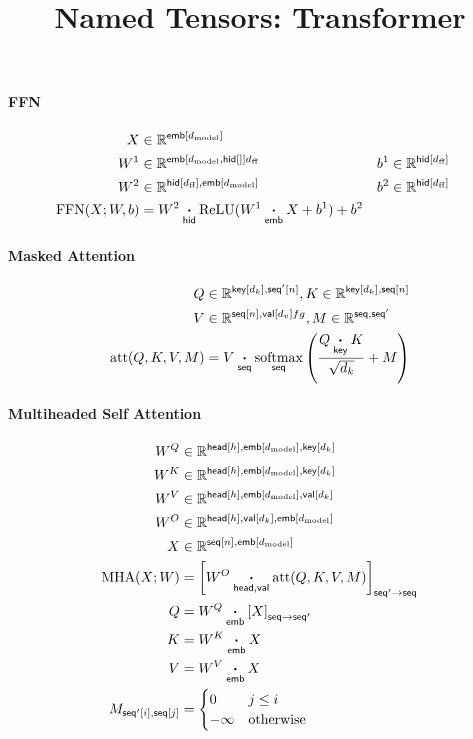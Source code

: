 \documentclass{article}
\title{Named Tensors: Transformer}
\date{}
\newcommand{\reals}[0]{\mathbb{R}}
\newcommand{\dmodel}{d_{\text{model}}}
\newcommand{\dff}{d_{\text{ff}}}
\begin{document}
\maketitle


\paragraph{FFN}
\begin{align*}
X &\in \reals^{\nset{emb}{\dmodel}} \\
W^1 &\in \reals^{\nset{emb}{\dmodel, \nset{hid}}{\dff}} & 
b^1 &\in \reals^{\nset{hid}{\dff}} \\
W^2 & \in \reals^{\nset{hid}{\dff}, \nset{emb}{\dmodel}} & b^2 &\in \reals^{\nset{hid}{\dff}} \\
\text{FFN}(X; W, b) &=  W^2 \ndot{hid} \text{ReLU}(W^1 \ndot{emb} X + b^1) + b^2
\end{align*}

\paragraph{Masked Attention}
\begin{align*} 
Q &\in \reals^{\nset{key}{d_k}, \nset{seq'}{n}}, K \in \reals^{\nset{key}{d_k}, \nset{seq}{n}}\\
V &\in \reals^{\nset{seq}{n}, \nset{val}{d_v}fg
},
M \in \reals^{\name{seq}, \name{seq'}}\\
\text{att}(Q, K, V, M) &=  V \ndot{seq} \nfun{seq}{softmax} \left( \frac{\displaystyle Q \ndot{key} K }{\sqrt{d_k}} + M \right) 
\end{align*}

\paragraph{Multiheaded Self Attention}
\begin{align*}
  W^Q &\in \mathbb{R}^{\nset{head}{h}, \nset{emb}{\dmodel}, \nset{key}{d_k}} \\
  W^K &\in \mathbb{R}^{\nset{head}{h}, \nset{emb}{\dmodel}, \nset{key}{d_k}} \\
  W^V &\in \mathbb{R}^{\nset{head}{h}, \nset{emb}{\dmodel}, \nset{val}{d_k}} \\
  W^O &\in \mathbb{R}^{\nset{head}{h}, \nset{val}{d_k}, \nset{emb}{\dmodel}} \\
  X &\in \mathbb{R}^{\nset{seq}{n}, \nset{emb}{\dmodel}} \\
  \text{MHA}(X; W) &= \nmov{seq'}{seq}{W^O \ndot{head,val} \text{att}(Q, K, V, M)} \\
  Q &= W^Q \ndot{emb} \nmov{seq}{seq'}{X} \\
  K &= W^K \ndot{emb} X \\
  V &= W^V \ndot{emb} X \\
  M_{\nidx{seq'}{i}, \nset{seq}{j}} &= \begin{cases} 0 & j\leq i \\ -\infty & \text{otherwise} \end{cases}   
\end{align*}
\end{document}
